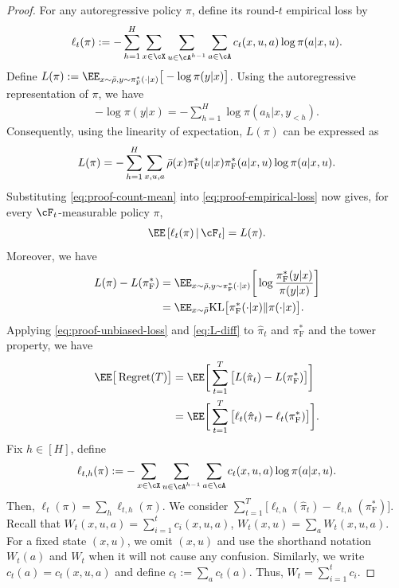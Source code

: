 \documentclass[11pt]{article}
\newcommand{\KL}{\text{KL}}
\newcommand{\pif}{\pi_{\mathrm{F}}}
\begin{document}
\begin{proof}
For any autoregressive policy $\pi$, define its round-$t$ empirical loss by
\begin{align}
    \ell_t(\pi)
    :=
    -\sum_{h=1}^H
    \sum_{x\in\cX}
    \sum_{u\in\cA^{h-1}}
    \sum_{a\in\cA}
    c_t(x,u,a)\log\pi(a|x,u).
    \label{eq:proof-empirical-loss}
\end{align}
Define $L(\pi):=\EE_{x\sim\bar\rho,y\sim\pif^*(\cdot|x)}\big[-\log\pi(y|x)\big]$. Using the autoregressive representation of $\pi$, we have
\begin{align*}
    -\log\pi(y|x)
    =
    -\sum_{h=1}^H
    \log\pi(a_h|x,y_{<h}).
\end{align*}
Consequently, using the linearity of expectation, $L(\pi)$ can be expressed as
\begin{align}
\notag
    L(\pi)
    =
    -\sum_{h=1}^H
    \sum_{x,u,a}
    \bar\rho(x)
    \pif^*(u|x)
    \pif^*(a|x,u)
    \log\pi(a|x,u).
\end{align}
Substituting \eqref{eq:proof-count-mean} into
\eqref{eq:proof-empirical-loss} now gives, for every
$\cF_t$-measurable policy $\pi$,
\begin{align}
    \EE\left[
        \ell_t(\pi)
        \,\middle|\,
        \cF_t
    \right]
    =
    L(\pi).
    \label{eq:proof-unbiased-loss}
\end{align}
Moreover, we have
\begin{align}
    L(\pi)-L(\pif^*)
    &=
    \EE_{x\sim\bar\rho,
                    y\sim\pif^*(\cdot|x)}
    \bigg[
        \log
        \frac{\pif^*(y|x)}
             {\pi(y|x)}
    \bigg]
    \notag\\\label{eq:L-diff}
    &=
    \EE_{x\sim\bar\rho}
    \KL\big[
        \pif^*(\cdot|x)
        \|
        \pi(\cdot|x)
    \big].
\end{align}
Applying \eqref{eq:proof-unbiased-loss} and \eqref{eq:L-diff} to $\hat\pi_t$ and $\pif^*$ and the tower property, we have
\begin{align}
\notag
    \EE\big[\operatorname{Regret}(T)\big]
    &= \EE \bigg[\sum_{t=1}^T \big[L(\hat \pi_t) - L(\pif^*)\big]\bigg]\\
    &=\EE\bigg[
        \sum_{t=1}^T
        \big[
            \ell_t(\hat\pi_t)
            -
            \ell_t(\pif^*)
        \big]
    \bigg].
    \label{eq:proof-regret-empirical}
\end{align}
Fix $h \in [H]$, define 
\begin{align*}
\ell_{t,h}(\pi) := -\sum_{x\in\cX}\sum_{u\in\cA^{h-1}}\sum_{a\in\cA}c_t(x,u,a)\log\pi(a|x,u).
\end{align*}
Then, $\ell_{t}(\pi) = \sum_{h} \ell_{t,h}(\pi)$. We consider $\sum_{t=1}^T
        \big[
            \ell_{t,h}(\hat\pi_t)
            -
            \ell_{t,h}(\pif^*)
        \big]$.
Recall that $W_t(x,u,a) = \sum_{i=1}^t c_i(x,u,a)$, $W_t(x,u) = \sum_a W_t(x,u,a)$. For a fixed state $(x,u)$, we omit $(x,u)$ and use the shorthand notation $W_t(a)$ and $W_t$ when it will not cause any confusion. Similarly, we write $c_t(a) = c_t(x,u,a)$ and define $c_t := \sum_a c_t(a)$. Thus, $W_t=\sum_{i=1}^t c_i$.


\end{proof}
\end{document}
